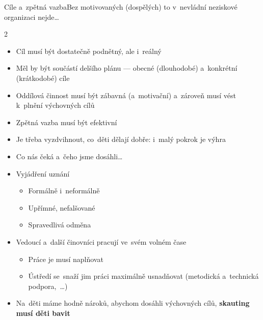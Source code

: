 \documentclass[compress, xelatex, 11pt, xcolor=dvipsnames, aspectratio=169, url={hyphens, lowtilde}]{beamer}
\begin{document}
\begin{frame}{Cíle a~zpětná vazba}{Bez motivovaných (dospělých) to v~nevládní neziskové organizaci nejde\ldots}
	\begin{multicols}{2}
		\begin{itemize}
			\item Cíl musí být dostatečně podnětný, ale i~reálný
			\item Měl by být součástí delšího plánu --- obecné (dlouhodobé) a~konkrétní (krátkodobé) cíle
			\item Oddílová činnost musí být zábavná (a~motivační) a~zároveň musí vést k~plnění výchovných cílů
			\item Zpětná vazba musí být efektivní
			\item Je třeba vyzdvihnout, co~děti dělají dobře: i~malý pokrok je výhra
			\item Co nás čeká a~čeho jsme dosáhli\ldots
			\item Vyjádření uznání
			\begin{itemize}
				\item Formálně i~neformálně
				\item Upřímné, nefalšované
				\item Spravedlivá odměna
			\end{itemize}
		\end{itemize}
	\end{multicols}
	\begin{itemize}
		\item Vedoucí a~další činovníci pracují ve~svém volném čase
		\begin{itemize}
			\item Práce je musí naplňovat
			\item Ústředí se~snaží jim práci maximálně usnadňovat (metodická a~technická podpora,~\ldots)
		\end{itemize}
		\item Na~děti máme hodně nároků, abychom dosáhli výchovných cílů, \textbf{skauting musí děti bavit}
	\end{itemize}
\end{frame}
\end{document}
